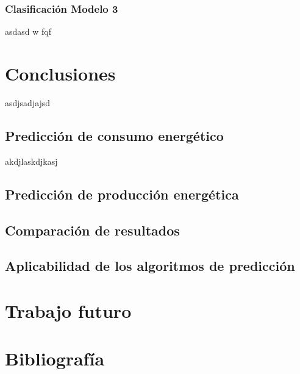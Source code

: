 \documentclass[a4paper,12pt]{article}
\begin{document}
\subsubsection{Clasificación Modelo 3}

asdasd w fqf

\section{Conclusiones}
asdjsadjajsd

\subsection{Predicción de consumo energético}
akdjlaskdjkasj

\subsection{Predicción de producción energética}

\subsection{Comparación de resultados}

\subsection{Aplicabilidad de los algoritmos de predicción}

\section{Trabajo futuro}

\section*{Bibliografía}

\printbibliography
\end{document}

